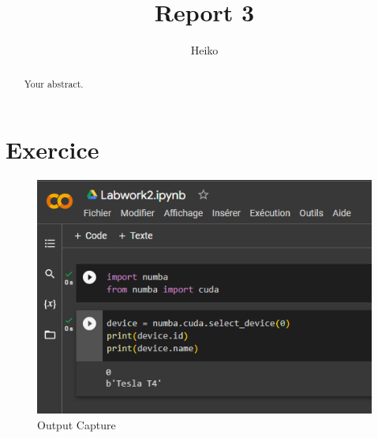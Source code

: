 \documentclass{article}
\title{Report 3}
\author{Heiko}
\begin{document}
\maketitle

\begin{abstract}
Your abstract.
\end{abstract}

\section{Exercice}

\begin{figure}[h]
\centering
\includegraphics[width=0.5\linewidth]{Images/labwork2.PNG}
\caption{\label{fig:labwork2}Output Capture}
\end{figure}
\end{document}

